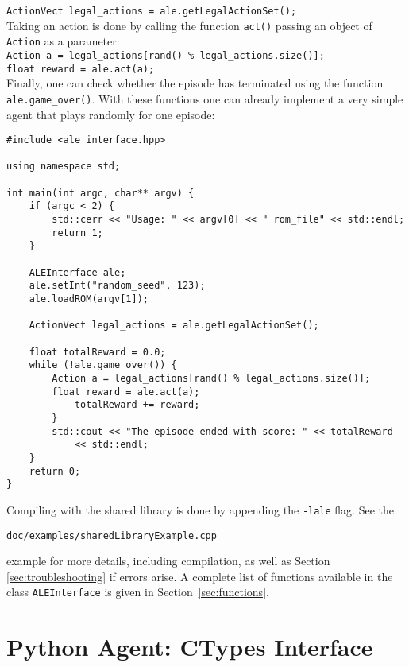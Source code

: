 \documentclass[12pt]{article}
\begin{document}
\verb+ActionVect legal_actions = ale.getLegalActionSet();+\\

Taking an action is done by calling the function \verb+act()+ passing an object of \verb+Action+ as a parameter:\\

\verb+Action a = legal_actions[rand() % legal_actions.size()];+\\
\indent \verb+float reward = ale.act(a);+\\

Finally, one can check whether the episode has terminated using the function \verb+ale.game_over()+. With these 
functions one can already implement a very simple agent that plays randomly for one episode:

\begin{verbatim}
#include <ale_interface.hpp>

using namespace std;

int main(int argc, char** argv) {
    if (argc < 2) {
        std::cerr << "Usage: " << argv[0] << " rom_file" << std::endl;
        return 1;
    }

    ALEInterface ale;
    ale.setInt("random_seed", 123);
    ale.loadROM(argv[1]);

    ActionVect legal_actions = ale.getLegalActionSet();
    
    float totalReward = 0.0;
    while (!ale.game_over()) {
        Action a = legal_actions[rand() % legal_actions.size()];    
        float reward = ale.act(a);
            totalReward += reward;
        }
        std::cout << "The episode ended with score: " << totalReward 
            << std::endl;
    }
    return 0;
}
\end{verbatim}

Compiling with the shared library is done by appending the \verb+-lale+ flag. 
See the 

\begin{center} \verb+doc/examples/sharedLibraryExample.cpp+\end{center}

example for more details, including compilation, as
well as Section \ref{sec:troubleshooting} if errors arise.
A complete list of functions available in the class \verb+ALEInterface+ is given in Section~\ref{sec:functions}.

\section{Python Agent: CTypes Interface}\label{sec:python_interface}
\end{document}

